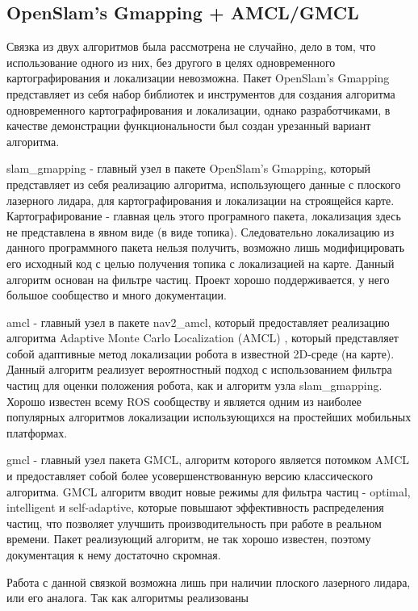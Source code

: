 \documentclass[a4paper, 14pt]{extreport}
\begin{document}
\subsection{OpenSlam's Gmapping + AMCL/GMCL}
\par Связка из двух алгоритмов была рассмотрена не случайно, дело в том, что использование одного из них, без другого в целях одновременного 
картографирования и локализации невозможна. Пакет OpenSlam's Gmapping представляет из себя набор библиотек и инструментов для создания 
алгоритма одновременного картографирования и локализации, однако разработчиками, в качестве демонстрации функциональности был создан 
урезанный вариант алгоритма.
\par\noindent slam\_gmapping - главный узел в пакете OpenSlam's Gmapping, который представляет из себя реализацию алгоритма,
 использующего данные с плоского лазерного лидара, для картографирования и локализации на строящейся карте. Картографирование - главная
 цель этого програмного пакета, локализация здесь не представлена в явном виде (в виде топика). Следовательно локализацию из данного
 программного пакета нельзя получить, возможно лишь модифицировать его исходный код с целью получения топика с локализацией на карте.
 Данный алгоритм основан на фильтре частиц. Проект хорошо поддерживается, у него большое сообщество и много документации.
\par\noindent amcl - главный узел в пакете nav2\_amcl, который предоставляет реализацию алгоритма Adaptive Monte Carlo Localization (AMCL)\cite{amclArt}\cite{amclArt1}
 , который представляет собой адаптивные метод локализации робота в известной 2D-среде (на карте). Данный алгоритм реализует вероятностный
 подход с использованием фильтра частиц для оценки положения робота, как и алгоритм узла slam\_gmapping. Хорошо известен всему ROS 
 сообществу и является одним из наиболее популярных алгоритмов локализации использующихся на простейших мобильных платформах.
\par\noindent gmcl - главный узел пакета GMCL\cite{gmclArt}, алгоритм которого является потомком AMCL и предоставляет собой более усовершенствованную
 версию классического алгоритма. GMCL алгоритм вводит новые режимы для фильтра частиц - optimal, intelligent и self-adaptive, которые
 повышают эффективность распределения частиц, что позволяет улучшить производительность при работе в реальном времени. Пакет реализующий 
 алгоритм, не так хорошо известен, поэтому документация к нему достаточно скромная.
\par\noindent Работа с данной связкой возможна лишь при наличии плоского лазерного лидара, или его аналога. Так как алгоритмы реализованы 
\end{document}
